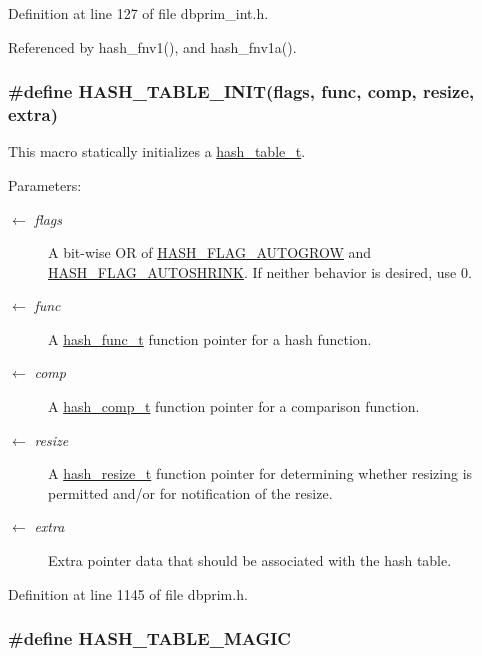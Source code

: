 Definition at line 127 of file dbprim\_\-int.h.

Referenced by hash\_\-fnv1(), and hash\_\-fnv1a().\hypertarget{group__dbprim__hash_ga26}{
\subsubsection[HASH\_\-TABLE\_\-INIT]{\setlength{\rightskip}{0pt plus 5cm}\#define HASH\_\-TABLE\_\-INIT(flags, func, comp, resize, extra)}}
\label{group__dbprim__hash_ga26}


This macro statically initializes a \hyperlink{group__dbprim__hash_ga1}{hash\_\-table\_\-t}.

\begin{Desc}
\item[Parameters:]
\begin{description}
\item[\mbox{$\leftarrow$} {\em flags}]A bit-wise OR of \hyperlink{group__dbprim__hash_ga23}{HASH\_\-FLAG\_\-AUTOGROW} and \hyperlink{group__dbprim__hash_ga24}{HASH\_\-FLAG\_\-AUTOSHRINK}. If neither behavior is desired, use 0. \item[\mbox{$\leftarrow$} {\em func}]A \hyperlink{group__dbprim__hash_ga4}{hash\_\-func\_\-t} function pointer for a hash function. \item[\mbox{$\leftarrow$} {\em comp}]A \hyperlink{group__dbprim__hash_ga5}{hash\_\-comp\_\-t} function pointer for a comparison function. \item[\mbox{$\leftarrow$} {\em resize}]A \hyperlink{group__dbprim__hash_ga6}{hash\_\-resize\_\-t} function pointer for determining whether resizing is permitted and/or for notification of the resize. \item[\mbox{$\leftarrow$} {\em extra}]Extra pointer data that should be associated with the hash table.\end{description}
\end{Desc}


Definition at line 1145 of file dbprim.h.\hypertarget{group__dbprim__hash_ga22}{
\subsubsection[HASH\_\-TABLE\_\-MAGIC]{\setlength{\rightskip}{0pt plus 5cm}\#define HASH\_\-TABLE\_\-MAGIC}}
\label{group__dbprim__hash_ga22}


